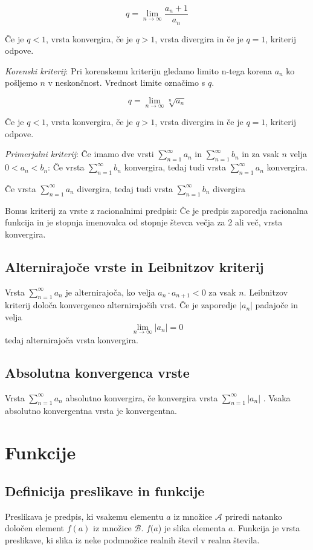 \documentclass[12pt]{report}
\begin{document}
 \[q = \lim_{n \to \infty}\frac{a_n+1}{a_n}\]
 
Če je $q < 1$, vrsta konvergira, če je $q > 1$, vrsta divergira in če je $q=1$, kriterij odpove.

\emph{Korenski kriterij}: Pri korenskemu kriteriju gledamo limito n-tega korena $a_n$ ko pošljemo $n$ v neskončnost. Vrednost limite označimo s $q$.
 
 \[q = \lim_{n \to \infty}\sqrt[n]{a_n}\]
 
Če je $q < 1$, vrsta konvergira, če je $q > 1$, vrsta divergira in če je $q=1$, kriterij odpove.

\emph{Primerjalni kriterij}: Če imamo dve vrsti $\displaystyle\sum_{n=1}^{\infty}a_n$ in $\displaystyle\sum_{n=1}^{\infty}b_n$ in za vsak $n$ velja $0<a_n<b_n$:
Če vrsta $\displaystyle\sum_{n=1}^{\infty}b_n$ konvergira, tedaj tudi vrsta $\displaystyle\sum_{n=1}^{\infty}a_n$ konvergira.

Če vrsta $\displaystyle\sum_{n=1}^{\infty}a_n$ divergira, tedaj tudi vrsta $\displaystyle\sum_{n=1}^{\infty}b_n$ divergira

Bonus kriterij za vrste z racionalnimi predpisi: Če je predpis zaporedja racionalna funkcija in je stopnja imenovalca od stopnje števca večja za 2 ali več, vrsta konvergira.

\section*{Alternirajoče vrste in Leibnitzov kriterij}
Vrsta  $\displaystyle\sum_{n=1}^{\infty}a_n$ je alternirajoča, ko velja $a_n \cdot a_{n+1}<0$ za vsak $n$. Leibnitzov kriterij določa konvergenco alternirajočih vrst. Če je zaporedje $|a_n|$ padajoče in velja
 \[\lim_{n \to \infty}|a_n|=0\]
tedaj alternirajoča vrsta konvergira.

\section*{Absolutna konvergenca vrste}
Vrsta $\displaystyle\sum_{n=1}^{\infty}a_n$ absolutno konvergira, če konvergira vrsta  $\displaystyle\sum_{n=1}^{\infty}|a_n|$ . Vsaka absolutno konvergentna vrsta je konvergentna.

 


\chapter*{Funkcije}

\section*{Definicija preslikave in funkcije}
Preslikava je predpis, ki vsakemu elementu $a$ iz množice $ \mathcal{A}$ priredi natanko določen element $f(a)$ iz množice $ \mathcal{B}$. $f(a$) je slika elementa $a$. 
Funkcija je vrsta preslikave, ki slika iz neke podmnožice realnih števil v realna števila.
\end{document}
